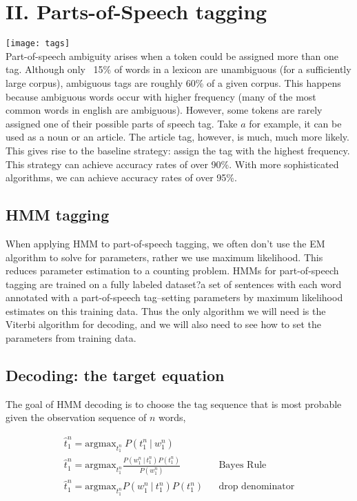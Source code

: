 \documentclass[11pt]{article}
\begin{document}
	\section*{II. Parts-of-Speech tagging}
		\texttt{[image: tags]} \\
		
		Part-of-speech ambiguity arises when a token could be assigned more than one tag. Although only ~15\% of words in 
		a lexicon are unambiguous (for a sufficiently large corpus), ambiguous tags are roughly 60\% of a given corpus. This 
		happens because ambiguous words occur with higher frequency (many of the most common words in english are 
		ambiguous). However, some tokens are rarely assigned one of their possible parts of speech tag. Take $a$ for 
		example, it can be used as a noun or an article. The article tag, however, is much, much more likely. This gives rise to 
		the baseline strategy: assign the tag with the highest frequency. This strategy can achieve accuracy rates of over 
		90\%. With more sophisticated algorithms, we can achieve accuracy rates of over 95\%. 
		
	\subsection*{HMM tagging} 
		When applying HMM to part-of-speech tagging, we often don't use the EM algorithm to solve for parameters, rather 			we use maximum likelihood. This reduces parameter estimation to a counting problem. HMMs for part-of-speech
		tagging are trained on a fully labeled dataset?a set of sentences with each word annotated with a part-of-speech 
		tag--setting parameters by maximum likelihood	estimates on this training data. Thus the only algorithm we will 
		need is the Viterbi algorithm for decoding, and we will also need to see how to set the parameters from training data.
		
		\subsection*{Decoding: the target equation} 
			The goal of HMM decoding is to choose the tag sequence that is most probable given the observation sequence of $n$ words,
			
			\begin{align*}
			\hat t_1^n  = \textrm{argmax}_{t_1^n} \ P(t_1^n \ | \ w_1^n) \\[1em]
			\hat t_1^n = \textrm{argmax}_{t_1^n}  \frac{P(w_1^n \ | \ t_1^n)P(t_1^n)}{P(w_1^n)} && \text{Bayes Rule} \\[1em]
			\hat t_1^n = \textrm{argmax}_{t_1^n} P(w_1^n \ | \ t_1^n)P(t_1^n)  && \text{drop denominator} \\
			\end{align*}
			
\end{document}
